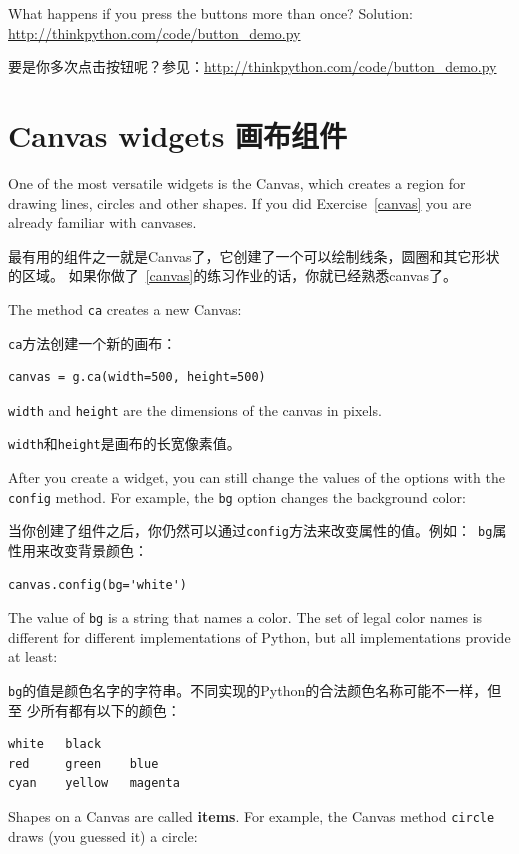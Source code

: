 \documentclass[10pt]{book}
\begin{document}
\begin{CJK}{UTF8}{gbsn}
\begin{exercise}
What happens if you press the buttons more than once?
Solution: \url{http://thinkpython.com/code/button_demo.py}

要是你多次点击按钮呢？参见：\url{http://thinkpython.com/code/button_demo.py}

\end{exercise}


\section{Canvas widgets 画布组件}

One of the most versatile widgets is the Canvas, which creates
a region for drawing lines, circles and other shapes.  If you
did Exercise~\ref{canvas} you are already familiar with canvases.

最有用的组件之一就是Canvas了，它创建了一个可以绘制线条，圆圈和其它形状的区域。
如果你做了~\ref{canvas}的练习作业的话，你就已经熟悉canvas了。

The method {\tt ca} creates a new Canvas:

{\tt ca}方法创建一个新的画布：

\begin{verbatim}
canvas = g.ca(width=500, height=500)
\end{verbatim}
%
{\tt width} and {\tt height} are the dimensions of the canvas
in pixels.  

{\tt width}和{\tt height}是画布的长宽像素值。

After you create a widget, you can still change the values of
the options with the
{\tt config} method.  For example, the {\tt bg} option changes
the background color:

当你创建了组件之后，你仍然可以通过{\tt config}方法来改变属性的值。例如：{\tt
bg}属性用来改变背景颜色：

\begin{verbatim}
canvas.config(bg='white')
\end{verbatim}
%
The value of {\tt bg} is a string
that names a color.  The set of legal color names is different
for different implementations of Python, but all implementations
provide at least:

{\tt bg}的值是颜色名字的字符串。不同实现的Python的合法颜色名称可能不一样，但至
少所有都有以下的颜色：

\begin{verbatim}
white   black
red     green    blue   
cyan    yellow   magenta
\end{verbatim}
%
Shapes on a Canvas are called {\bf items}.  For example,
the Canvas method {\tt circle} draws (you guessed it) a circle:


\end{CJK}
\end{document}
